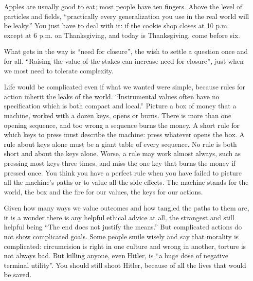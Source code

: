 
Apples are usually good to eat; most people have ten fingers. Above the level of particles and fields, ``practically every generalization you use in the real world will be leaky.'' You just have to deal with it: if the cookie shop closes at 10 p.m. except at 6 p.m. on Thanksgiving, and today is Thanksgiving, come before six.

What gets in the way is ``need for closure'', the wish to settle a question once and for all. ``Raising the value of the stakes can increase need for closure'', just when we most need to tolerate complexity. 

Life would be complicated even if what we wanted were simple, because rules for action inherit the leaks of the world. ``Instrumental values often have no specification which is both compact and local.'' Picture a box of money that a machine, worked with a dozen keys, opens or burns. There is more than one opening sequence, and too wrong a sequence burns the money. A short rule for which keys to press must describe the machine: press whatever opens the box. A rule about keys alone must be a giant table of every sequence. No rule is both short and about the keys alone. Worse, a rule may work almost always, such as pressing most keys three times, and miss the one key that burns the money if pressed once. You think you have a perfect rule when you have failed to picture all the machine's paths or to value all the side effects. The machine stands for the world, the box and the fire for our values, the keys for our actions. 

Given how many ways we value outcomes and how tangled the paths to them are, it is a wonder there is any helpful ethical advice at all, the strangest and still helpful being ``The end does not justify the means.'' But complicated actions do not show complicated goals. Some people smile wisely and say that morality is complicated: circumcision is right in one culture and wrong in another, torture is not always bad. But killing anyone, even Hitler, is ``a huge dose of negative terminal utility''. You should still shoot Hitler, because of all the lives that would be saved. 

